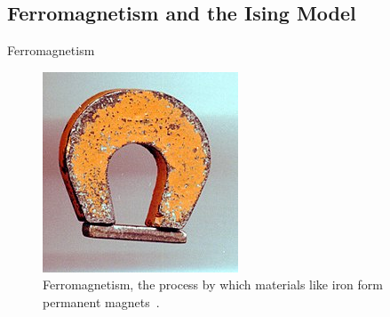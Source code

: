 \documentclass{beamer}
\begin{document}
\subsection{Ferromagnetism and the Ising Model}
\begin{frame}{Ferromagnetism}
  \begin{figure}[ht]
    \centering
    \includegraphics[width=0.5\linewidth]{figures/magnet.jpg}
    \caption{Ferromagnetism, the process by which materials like iron
      form permanent magnets~\cite{magnet}.}
  \end{figure}
\end{frame}

\end{document}
